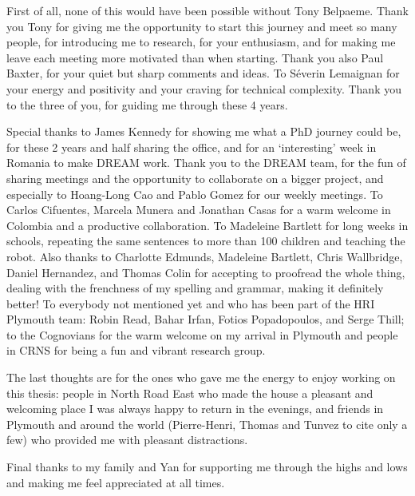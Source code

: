 First of all, none of this would have been possible without Tony Belpaeme. Thank you Tony for giving me the opportunity to start this journey and meet so many people, for introducing me to research, for your enthusiasm, and for making me leave each meeting more motivated than when starting. Thank you also Paul Baxter, for your quiet but sharp comments and ideas. %
To S\'{e}verin Lemaignan for your energy and positivity and your craving for technical complexity. Thank you to the three of you, for guiding me through these 4 years.

Special thanks to James Kennedy for showing me what a PhD journey could be, for these 2 years and half sharing the office, and for an `interesting' week in Romania to make DREAM work. Thank you to the DREAM team, for the fun of sharing meetings and the opportunity to collaborate on a bigger project, and especially to Hoang-Long Cao and Pablo Gomez for our weekly meetings. To Carlos Cifuentes, Marcela Munera and Jonathan Casas for a warm welcome in Colombia and a productive collaboration. To Madeleine Bartlett for long weeks in schools, repeating the same sentences to more than 100 children and teaching the robot. Also thanks to Charlotte Edmunds, Madeleine Bartlett, Chris Wallbridge, Daniel Hernandez, and Thomas Colin for accepting to proofread the whole thing, dealing with the frenchness of my spelling and grammar, making it definitely better! To everybody not mentioned yet and who has been part of the HRI Plymouth team: Robin Read, Bahar Irfan, Fotios Popadopoulos, and Serge Thill; to the Cognovians for the warm welcome on my arrival in Plymouth and people in CRNS for being a fun and vibrant research group.

The last thoughts are for the ones who gave me the energy to enjoy working on this thesis: people in North Road East who made the house a pleasant and welcoming place I was always happy to return in the evenings, and friends in Plymouth and around the world (Pierre-Henri, Thomas and Tunvez to cite only a few) who provided me with pleasant distractions.

Final thanks to my family and Yan for supporting me through the highs and lows and making me feel appreciated at all times.